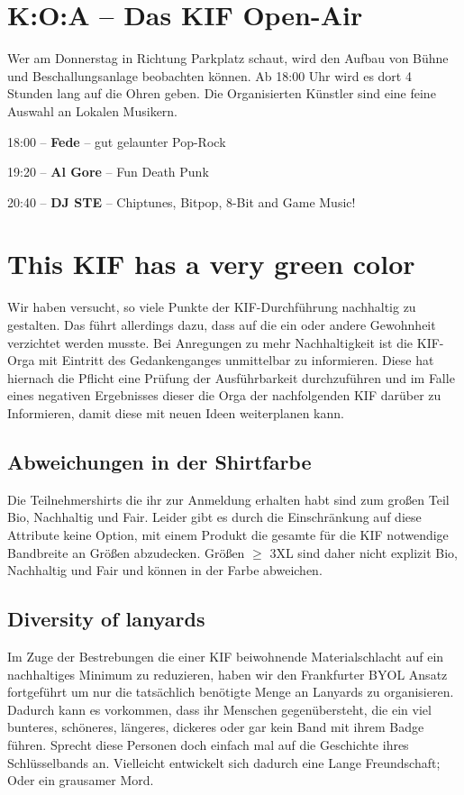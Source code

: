\section*{K:O:A -- Das KIF Open-Air}
Wer am Donnerstag in Richtung Parkplatz schaut, wird den Aufbau von Bühne und Beschallungsanlage beobachten können.
Ab 18:00 Uhr wird es dort 4 Stunden lang auf die Ohren geben.
Die Organisierten Künstler sind eine feine Auswahl an Lokalen Musikern.

18:00 -- \textbf{Fede} -- gut gelaunter Pop-Rock

19:20 -- \textbf{Al Gore} -- Fun Death Punk

20:40 -- \textbf{DJ STE} -- Chiptunes, Bitpop, 8-Bit and Game Music!

\section*{This KIF has a very green color}
Wir haben versucht, so viele Punkte der KIF-Durchführung nachhaltig zu gestalten. Das führt
allerdings dazu, dass auf die ein oder andere Gewohnheit verzichtet werden musste. Bei Anregungen
zu mehr Nachhaltigkeit ist die KIF-Orga mit Eintritt des Gedankenganges unmittelbar zu informieren.
Diese hat hiernach die Pflicht eine Prüfung der Ausführbarkeit durchzuführen und im Falle eines
negativen Ergebnisses dieser die Orga der nachfolgenden KIF darüber zu Informieren, damit diese mit
neuen Ideen weiterplanen kann.

\subsection*{Abweichungen in der Shirtfarbe}
Die Teilnehmershirts die ihr zur Anmeldung erhalten habt sind zum großen Teil Bio, Nachhaltig und
Fair. Leider gibt es durch die Einschränkung auf diese Attribute keine Option, mit einem Produkt die
gesamte für die KIF notwendige Bandbreite an Größen abzudecken. Größen $\geq$ 3XL sind daher nicht
explizit Bio, Nachhaltig und Fair und können in der Farbe abweichen.

\subsection*{Diversity of lanyards}
Im Zuge der Bestrebungen die einer KIF beiwohnende Materialschlacht auf ein nachhaltiges Minimum zu
reduzieren, haben wir den Frankfurter BYOL Ansatz fortgeführt um nur die tatsächlich benötigte Menge
an Lanyards zu organisieren. Dadurch kann es vorkommen, dass ihr Menschen gegenübersteht, die ein
viel bunteres, schöneres, längeres, dickeres oder gar kein Band mit ihrem Badge führen. Sprecht
diese Personen doch einfach mal auf die Geschichte ihres Schlüsselbands an. Vielleicht entwickelt
sich dadurch eine Lange Freundschaft; Oder ein grausamer Mord.

